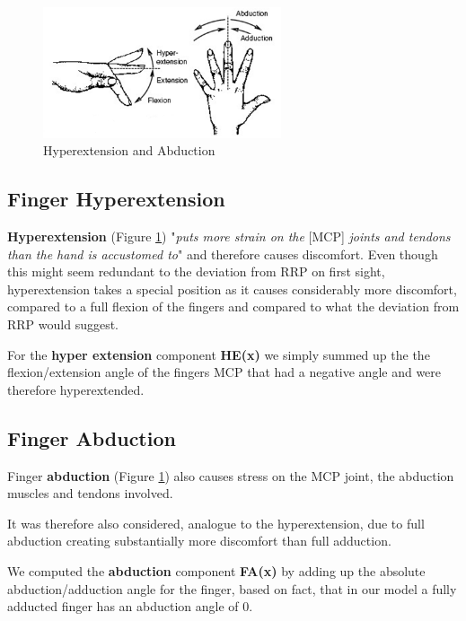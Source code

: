 \documentclass{sig-alternate-05-2015}
\begin{document}
\begin{figure}[b]
\centering
\includegraphics[width=7cm]{abduction}
\vspace{-20pt}
\caption{Hyperextension and Abduction}
\label{fig:hyperabduction}
\vspace{-10pt}
\end{figure}

\subsection{Finger Hyperextension}

\textbf{Hyperextension} (Figure \ref{fig:hyperabduction}) "\textit{puts more strain on the }[MCP] \textit{joints and tendons than the hand is accustomed to}" \cite{laviola1999survey} and therefore causes discomfort.\cite{laviola1999survey}
Even though this might seem redundant to the deviation from RRP on first sight, hyperextension takes a special position as it causes considerably more discomfort, compared to a full flexion of the fingers and compared to what the deviation from RRP would suggest.

For the \textbf{hyper extension} component \textbf{HE(x)} we simply summed up the the flexion/extension angle of the fingers MCP that had a negative angle and were therefore hyperextended.

\subsection{Finger Abduction}

Finger \textbf{abduction} (Figure \ref{fig:hyperabduction})
also causes stress on the MCP joint, the abduction muscles and tendons involved.

It was therefore also considered, analogue to the hyperextension, due to full abduction creating substantially more discomfort than full adduction.

We computed the \textbf{abduction} component \textbf{FA(x)} by adding up the absolute abduction/adduction angle for the finger, based on fact, that in our model a fully adducted finger has an abduction angle of 0.
\end{document}
